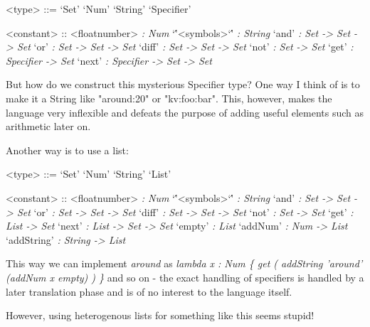 \documentclass[12pt]{extarticle}
\begin{document}
\begin{grammar}
<type> ::= `Set'
\alt `Num'
\alt `String'
\alt `Specifier'

<constant>
    ::   <floatnumber> \hspace*{\fill}\textit {: Num}
    \alt `\''<symbols>`\'' \hspace*{\fill}\textit {: String}
    \alt `and'  \hspace*{\fill}\textit {: Set -> Set -> Set}
    \alt `or'   \hspace*{\fill}\textit {: Set -> Set -> Set}
    \alt `diff' \hspace*{\fill}\textit {: Set -> Set -> Set}
    \alt `not'  \hspace*{\fill}\textit {: Set -> Set}
    \alt `get'  \hspace*{\fill}\textit {: Specifier -> Set}
    \alt `next' \hspace*{\fill}\textit {: Specifier -> Set -> Set}
\end{grammar}

But how do we construct this mysterious Specifier type? One way I think of is
to make it a String like "around:20" or "kv:foo:bar". This, however, makes
the language very inflexible and defeats the purpose of adding useful elements
such as arithmetic later on.

Another way is to use a list:

\begin{grammar}
<type> ::= `Set'
\alt `Num'
\alt `String'
\alt `List'

<constant>
    ::   <floatnumber> \hspace*{\fill}\textit {: Num}
    \alt `\''<symbols>`\'' \hspace*{\fill}\textit {: String}
    \alt `and'  \hspace*{\fill}\textit {: Set -> Set -> Set}
    \alt `or'   \hspace*{\fill}\textit {: Set -> Set -> Set}
    \alt `diff' \hspace*{\fill}\textit {: Set -> Set -> Set}
    \alt `not'  \hspace*{\fill}\textit {: Set -> Set}
    \alt `get'  \hspace*{\fill}\textit {: List -> Set}
    \alt `next' \hspace*{\fill}\textit {: List -> Set -> Set}
    \alt `empty' \hspace*{\fill}\textit {: List}
    \alt `addNum' \hspace*{\fill}\textit {: Num -> List}
    \alt `addString' \hspace*{\fill}\textit {: String -> List}
\end{grammar}

This way we can implement \textit{around} as \textit{lambda x : Num \{ get ( addString 'around' (addNum x empty) ) \}}
and so on - the exact handling of specifiers is handled by a later translation
phase and is of no interest to the language itself.

However, using heterogenous lists for something like this seems stupid!
\end{document}
